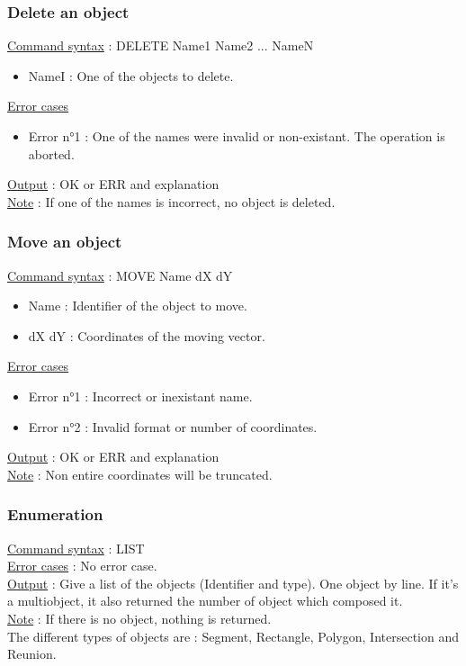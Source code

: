 \documentclass[a4paper, 12pts]{article}
\begin{document}
		\subsubsection{Delete an object}
			\uline{Command syntax} :
			DELETE Name1 Name2 ... NameN
			\begin{itemize}
				\item NameI : One of the objects to delete.
			\end{itemize}
			\uline{Error cases}
			\begin{itemize}
				\item Error n°1 : One of the names were invalid or non-existant. The operation is aborted.
			\end{itemize}
			\uline{Output} : OK or ERR and explanation\\
			\uline{Note} : 
			If one of the names is incorrect, no object is deleted.

		\subsubsection{Move an object}
			\uline{Command syntax} :
			MOVE Name dX dY
			\begin{itemize}
				\item Name : Identifier of the object to move.
				\item dX dY : Coordinates of the moving vector.
			\end{itemize}
			\uline{Error cases}
			\begin{itemize}
				\item Error n°1 : Incorrect or inexistant name.
				\item Error n°2 : Invalid format or number of coordinates.
			\end{itemize}
			\uline{Output} : OK or ERR and explanation\\
			\uline{Note} : 
			Non entire coordinates will be truncated.

		\subsubsection{Enumeration}
			\uline{Command syntax} :
			LIST\\
			\uline{Error cases} : No error case.\\
			\uline{Output} : Give a list of the objects (Identifier and type). One object by line. If it's a multiobject,
			it also returned the number of object which composed it.\\
			\uline{Note} : 
			If there is no object, nothing is returned.\\
			The different types of objects are : Segment, Rectangle, Polygon, Intersection and Reunion.
\end{document}
